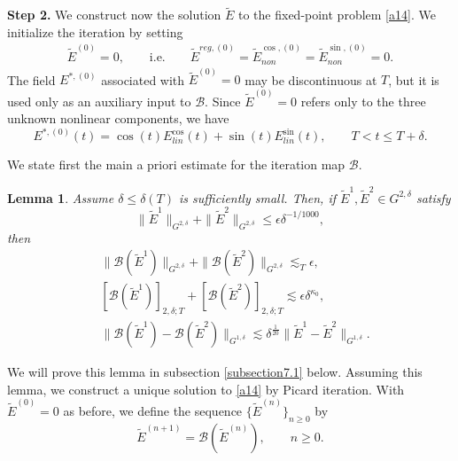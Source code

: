 \documentclass[reqno,11pt]{amsart}
\numberwithin{equation}{section}
\newtheorem{lemma}[theorem]{Lemma}
\begin{document}
	
	\textbf{Step 2.} We construct now the solution $\widetilde{E}$ to the fixed-point problem \eqref{a14}. We initialize the iteration by setting
	\begin{align*}
		\tilde E^{(0)}=0,\qquad\text{i.e.}\qquad
		\tilde{E}^{reg,(0)}=\tilde{E}^{\cos,(0)}_{non}=\tilde{E}^{\sin,(0)}_{non}=0.
	\end{align*}
	The field $E^{\ast,(0)}$ associated with \(\widetilde E^{(0)}=0\) may be discontinuous at \(T\), but it is used only as an auxiliary input to \(\mathcal B\). Since $\tilde E^{(0)}=0$ refers only to the three unknown nonlinear
	components, we have
	\begin{equation*}
		E^{\ast,(0)}(t)=\cos(t)E_{lin}^{\cos}(t)+\sin(t)E_{lin}^{\sin}(t),
		\qquad T<t\le T+\delta.
	\end{equation*}
	
	We state first the main a priori estimate for the iteration map $\mathcal{B}$.
	
	\begin{lemma}\label{keyLe} Assume $\delta\leq \delta(T)$ is sufficiently small. Then, if $\tilde E^1, \tilde{E}^2\in G^{2,\delta}$ satisfy
		\begin{equation}\label{a27}
			\|\tilde E^1\|_{G^{2,\delta}}+\|\tilde E^2\|_{G^{2,\delta}}\le \epsilon\delta^{-1/1000},
		\end{equation}
		then
		\begin{align}\label{a26}
		&\|\mathcal{B}(\tilde E^1)\|_{G^{2,\delta}}+\|\mathcal{B}(\tilde E^2)\|_{G^{2,\delta}}\lesssim_T\epsilon,\\&	
		\label{a24'}[\mathcal{B}(\tilde E^1)]_{2,\delta;T}+[\mathcal{B}(\tilde E^2)]_{2,\delta;T}\lesssim  \epsilon\delta^{\kappa_0},\\&
			\label{a24}\|\mathcal{B}(\tilde E^1)-	\mathcal{B}(\tilde E^2)\|_{G^{1,\delta}}\lesssim \delta^{\frac{1}{20}}\|\tilde E^1-\tilde E^2\|_{G^{1,\delta}}.
		\end{align}
	\end{lemma}
	
	We will prove this lemma in subsection \ref{subsection7.1} below. Assuming this lemma, we construct a unique solution to \eqref{a14} by Picard iteration. With $\widetilde{E}^{(0)}=0$ as before, we define the sequence $\{\tilde E^{(n)}\}_{n\ge0}$ by
	\begin{equation}\label{sec7eq10}
		\tilde E^{(n+1)}= \mathcal{B}(\tilde E^{(n)}), \qquad n\ge 0.
	\end{equation}
	
\end{document}
